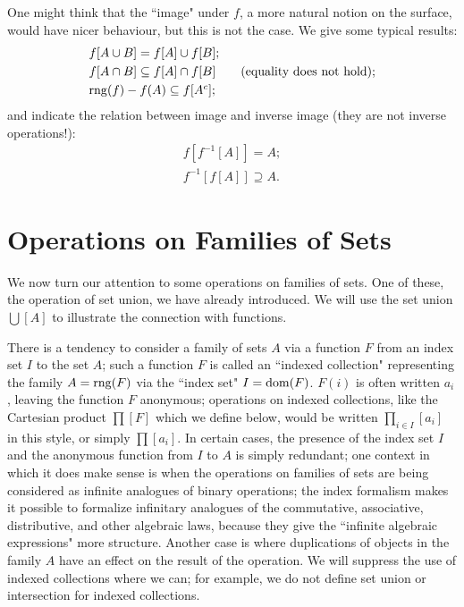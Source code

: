 One might think that the ``image" under $f$, a more natural
notion on the surface, would have nicer behaviour, but this is not the
case.  We give some typical results:
\begin{displaymath}
 \begin{array}{l}
  f[A \cup B] = f[A] \cup f[B];\\[1mm]
  f[A \cap B] \subseteq f[A] \cap f[B]\qquad\mbox{(equality does not
       hold)};\\[1mm]
  \mathop{\mathrm{rng}}(f) - f(A) \subseteq f[A^c];
\end{array}
\end{displaymath}
and indicate the relation between image and inverse image
(they are not inverse operations!):
\begin{displaymath}
 \begin{array}{l}
  f[f^{-1}[A]] = A;\\[1mm]
  f^{-1}[f[A]] \supseteq A.
 \end{array}
\end{displaymath}




\section{Operations on Families of Sets}

We now turn our attention to some operations on families of
sets.  One of these, the operation of set union, we have
already introduced.  We will use the set union $\bigcup[A]$ to illustrate the
connection with functions.

There is a tendency to consider a family of sets
$A$ via a function $F$ from an index set $I$
to the set $A$; such a function $F$ is 
called an ``indexed collection" representing the family $A = \mathop{\mathrm{rng}}(F)$ via
the ``index set" $I = \mathop{\mathrm{dom}}(F)$.  $F(i)$ is often written $a_{i}$, leaving the
function $F$ anonymous; operations on indexed collections, like the
Cartesian product $\prod [F]$ which we define below,
would be written $\prod_{i \in I}[a_{i}]$ in this style, or simply $\prod
[a_{i}]$.  In certain cases, the presence of the index set $I$ and the
anonymous function from $I$ to $A$ is
simply redundant; one context in which it does make sense is when the
operations on families of sets are being considered as infinite
analogues of binary operations; the index formalism makes it possible
to formalize infinitary analogues of the commutative, associative,
distributive, and other algebraic laws, because they give the
``infinite algebraic expressions" more structure.  Another case is
where duplications of objects in the family $A$ have an effect on the
result of the operation.  We will suppress the use of indexed
collections where we can; for example, we do not define set
union or intersection for indexed
collections.

